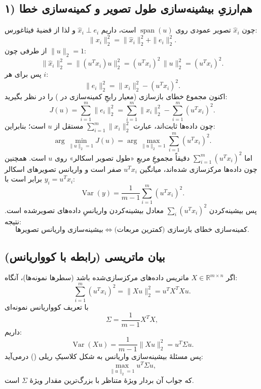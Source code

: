 \documentclass[12pt]{report}
\begin{document}
\subsection*{۱) هم‌ارزیِ بیشینه‌سازی طول تصویر و کمینه‌سازی خطا}
چون $\hat x_i$ تصویر عمودی روی $\operatorname{span}(u)$ است، داریم $\hat x_i \perp e_i$ و لذا از قضیهٔ فیثاغورس:
\[
\|x_i\|_2^2 = \|\hat x_i\|_2^2 + \|e_i\|_2^2.
\]
از طرفی چون $\|u\|_2=1$:
\[
\|\hat x_i\|_2^2=\|(u^{T}x_i)u\|_2^2=(u^{T}x_i)^2\,\|u\|_2^2=(u^{T}x_i)^2.
\]
پس برای هر $i$:
\[
\|e_i\|_2^2 = \|x_i\|_2^2 - (u^{T}x_i)^2.
\]
اکنون مجموع خطای بازسازی (معیار رایجِ کمینه‌سازی در ) را در نظر بگیرید:
\[
J(u)=\sum_{i=1}^{m}\|e_i\|_2^2
=\sum_{i=1}^{m}\|x_i\|_2^2-\sum_{i=1}^{m}(u^{T}x_i)^2.
\]
چون داده‌ها ثابت‌اند، عبارت $\sum_{i=1}^{m}\|x_i\|_2^2$ مستقل از $u$ است؛ بنابراین:
\[
\arg\min_{\|u\|_2=1} J(u)
=
\arg\max_{\|u\|_2=1}\sum_{i=1}^{m}(u^{T}x_i)^2.
\]
اما $\sum_{i=1}^{m}(u^{T}x_i)^2$ دقیقاً مجموعِ مربعِ «طول تصویر اسکالر» روی $u$ است. همچنین چون داده‌ها مرکزسازی شده‌اند، میانگین $u^{T}x_i$ صفر است و واریانس تصویرهای اسکالر $y_i=u^{T}x_i$ برابر است با:
\[
\operatorname{Var}(y)=\frac{1}{m-1}\sum_{i=1}^{m}(u^{T}x_i)^2.
\]
پس بیشینه‌کردن $\sum_{i}(u^{T}x_i)^2$ معادل بیشینه‌کردن واریانسِ داده‌های تصویرشده است. نتیجه:
\[
\boxed{\;
\text{بیشینه‌سازی واریانس تصویرها}
\;\Longleftrightarrow\;
\text{کمینه‌سازی خطای بازسازی (کمترین مربعات).}
\;}
\]

\subsection*{بیان ماتریسی (رابطه با کوواریانس)}
اگر $X\in\mathbb{R}^{m\times n}$ ماتریس داده‌های مرکزسازی‌شده باشد (سطرها نمونه‌ها)، آنگاه:
\[
\sum_{i=1}^{m}(u^{T}x_i)^2 = \|Xu\|_2^2 = u^{T}X^{T}Xu.
\]
با تعریف کوواریانس نمونه‌ای
\[
\Sigma=\frac{1}{m-1}X^{T}X,
\]
داریم:
\[
\operatorname{Var}(Xu)=\frac{1}{m-1}\|Xu\|_2^2 = u^{T}\Sigma u.
\]
پس مسئلهٔ بیشینه‌سازی واریانس به شکل کلاسیکِ ریلی () درمی‌آید:
\[
\max_{\|u\|_2=1} u^{T}\Sigma u,
\]
که جواب آن بردار ویژهٔ متناظر با بزرگ‌ترین مقدار ویژهٔ $\Sigma$ است.
\end{document}
